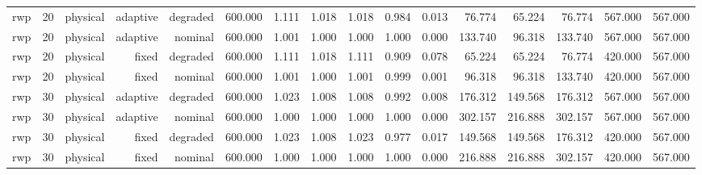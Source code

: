 \begin{tabular}{lrrrrrrrrrrrrrrr}
rwp & 20 & physical & adaptive & degraded & 600.000 & 1.111 & 1.018 & 1.018 & 0.984 & 0.013 & 76.774 & 65.224 & 76.774 & 567.000 & 567.000 \\
rwp & 20 & physical & adaptive & nominal & 600.000 & 1.001 & 1.000 & 1.000 & 1.000 & 0.000 & 133.740 & 96.318 & 133.740 & 567.000 & 567.000 \\
rwp & 20 & physical & fixed & degraded & 600.000 & 1.111 & 1.018 & 1.111 & 0.909 & 0.078 & 65.224 & 65.224 & 76.774 & 420.000 & 567.000 \\
rwp & 20 & physical & fixed & nominal & 600.000 & 1.001 & 1.000 & 1.001 & 0.999 & 0.001 & 96.318 & 96.318 & 133.740 & 420.000 & 567.000 \\
rwp & 30 & physical & adaptive & degraded & 600.000 & 1.023 & 1.008 & 1.008 & 0.992 & 0.008 & 176.312 & 149.568 & 176.312 & 567.000 & 567.000 \\
rwp & 30 & physical & adaptive & nominal & 600.000 & 1.000 & 1.000 & 1.000 & 1.000 & 0.000 & 302.157 & 216.888 & 302.157 & 567.000 & 567.000 \\
rwp & 30 & physical & fixed & degraded & 600.000 & 1.023 & 1.008 & 1.023 & 0.977 & 0.017 & 149.568 & 149.568 & 176.312 & 420.000 & 567.000 \\
rwp & 30 & physical & fixed & nominal & 600.000 & 1.000 & 1.000 & 1.000 & 1.000 & 0.000 & 216.888 & 216.888 & 302.157 & 420.000 & 567.000 \\
\bottomrule
\end{tabular}